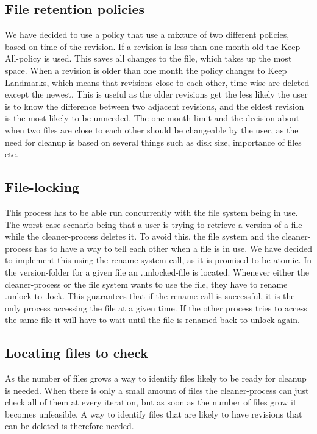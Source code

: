\documentclass[12pt]{article}
\begin{document}
\subsection{File retention policies}
We have decided to use a policy that use a mixture of two different
policies, based on time of the revision. If a revision is less than
one month old the Keep All-policy is used. This saves all changes to
the file, which takes up the most space. When a revision is older than
one month the policy changes to Keep Landmarks, which means that
revisions close to each other, time wise are deleted except the
newest. This is useful as the older revisions get the less likely the
user is to know the difference between two adjacent revisions, and the
eldest revision is the most likely to be unneeded.
The one-month limit and the decision about when two files are close to
each other should be changeable by the user, as the need for cleanup
is based on several things such as disk size, importance of files etc.

\subsection{File-locking}
This process has to be able run concurrently with the file system
being in use. The worst case scenario being that a user is trying to
retrieve a version of a file while the cleaner-process deletes it. To
avoid this, the file system and the cleaner-process has to have a way
to tell each other when a file is in use. We have decided to implement
this using the rename system call, as it is promised to be atomic. In
the version-folder for a given file an .unlocked-file is located.
Whenever either the cleaner-process or the file system wants to use
the file, they have to rename .unlock to .lock. This guarantees that
if the rename-call is successful, it is the only process accessing the
file at a given time. If the other process tries to access the same
file it will have to wait until the file is renamed back to unlock
again.

\subsection{Locating files to check}
As the number of files grows a way to identify files likely to be
ready for cleanup is needed. When there is only a small amount of
files the cleaner-process can just check all of them at every
iteration, but as soon as the number of files grow it becomes
unfeasible. A way to identify files that are likely to have revisions
that can be deleted is therefore needed.
\end{document}
